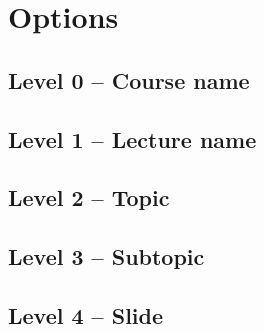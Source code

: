 \documentclass{article}
\begin{document}
\section{Options }

\subsection{Level 0 -- Course name}

\begin{description}
\item[]	
\item[]	
\item[]	
\end{description}

\subsection{Level 1 -- Lecture name}

\begin{description}
\item[]	
\item[]	
\item[]	
\end{description}


\subsection{Level 2 -- Topic}

\begin{description}
\item[]	
\item[]	
\item[]	
\end{description}

\subsection{Level 3 -- Subtopic}

\begin{description}
\item[]	
\item[]	
\item[]	
\end{description}

\subsection{Level 4 -- Slide}

\begin{description}
\item[]	
\item[]	
\item[]	
\end{description}
\end{document}
